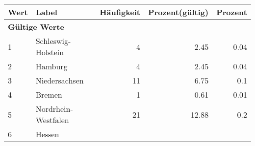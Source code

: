      \begin{longtable}{lXrrr}
     \toprule
     \textbf{Wert} & \textbf{Label} & \textbf{Häufigkeit} & \textbf{Prozent(gültig)} & \textbf{Prozent} \\
     \endhead
     \midrule
     \multicolumn{5}{l}{\textbf{Gültige Werte}}\\

     1 &
     \multicolumn{1}{X}{ Schleswig-Holstein   } &


       \num{4} &
       \num[round-mode=places,round-precision=2]{2,45} &
         \num[round-mode=places,round-precision=2]{0,04} \\

     2 &
     \multicolumn{1}{X}{ Hamburg   } &


       \num{4} &
       \num[round-mode=places,round-precision=2]{2,45} &
         \num[round-mode=places,round-precision=2]{0,04} \\

     3 &
     \multicolumn{1}{X}{ Niedersachsen   } &


       \num{11} &
       \num[round-mode=places,round-precision=2]{6,75} &
         \num[round-mode=places,round-precision=2]{0,1} \\

     4 &
     \multicolumn{1}{X}{ Bremen   } &


       \num{1} &
       \num[round-mode=places,round-precision=2]{0,61} &
         \num[round-mode=places,round-precision=2]{0,01} \\

     5 &
     \multicolumn{1}{X}{ Nordrhein-Westfalen   } &


       \num{21} &
       \num[round-mode=places,round-precision=2]{12,88} &
         \num[round-mode=places,round-precision=2]{0,2} \\

     6 &
     \multicolumn{1}{X}{ Hessen   } &



\end{longtable}
